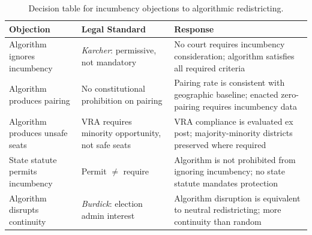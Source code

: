 \begin{table}[ht]
\centering
\begin{threeparttable}
\caption{Decision table for incumbency objections to algorithmic redistricting.}
\label{tab:decision-table}
\begin{tabular}{p{3.5cm} p{4cm} p{5cm}}
\toprule
Objection & Legal Standard & Response \\
\midrule
Algorithm ignores incumbency & \textit{Karcher}: permissive, not mandatory & No court
  requires incumbency consideration; algorithm satisfies all required criteria \\
\addlinespace
Algorithm produces pairing & No constitutional prohibition on pairing & Pairing rate
  is consistent with geographic baseline; enacted zero-pairing requires incumbency data \\
\addlinespace
Algorithm produces unsafe seats & VRA requires minority opportunity, not safe seats &
  VRA compliance is evaluated ex post; majority-minority districts preserved where required \\
\addlinespace
State statute permits incumbency & Permit $\neq$ require & Algorithm is not prohibited
  from ignoring incumbency; no state statute mandates protection \\
\addlinespace
Algorithm disrupts continuity & \textit{Burdick}: election admin interest & Algorithm
  disruption is equivalent to neutral redistricting; more continuity than random \\
\bottomrule
\end{tabular}
\end{threeparttable}
\end{table}
